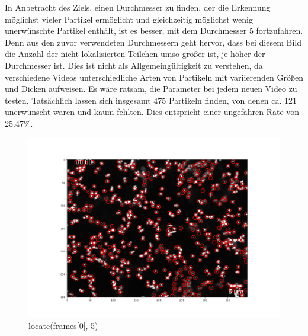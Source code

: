\begin{enumerate}
In Anbetracht des Ziels, einen Durchmesser zu finden, der die Erkennung möglichst vieler Partikel ermöglicht und gleichzeitig möglichst wenig unerwünschte Partikel enthält, ist es besser, mit dem Durchmesser 5 fortzufahren. Denn aus den zuvor verwendeten Durchmessern geht hervor, dass bei diesem Bild die Anzahl der nicht-lokalisierten Teilchen umso größer ist, je höher der Durchmesser ist. 
Dies ist nicht als Allgemeingültigkeit zu verstehen, da verschiedene Videos unterschiedliche Arten von Partikeln mit variierenden Größen und Dicken aufweisen. Es wäre ratsam, die Parameter bei jedem neuen Video zu testen.
Tatsächlich lassen sich insgesamt 475 Partikeln finden, von denen ca. 121 unerwünscht waren und kaum fehlten. Dies entspricht einer ungefähren Rate von 25.47\%.

\begin{figure}[H]
    \centering
    \includegraphics[scale=0.35]{Grafiken/trackpyBilder/locate(frames[0], 5).png}
    \caption{locate(frames[0], 5)}
    \label{fig:bild_label}
\end{figure} 


\end{enumerate}
